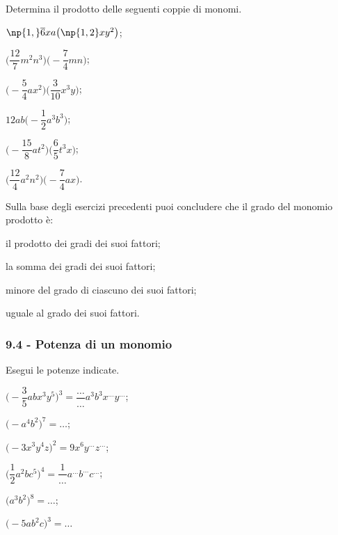 \begin{esercizio}
 \label{ese:9.15}
Determina il prodotto delle seguenti coppie di monomi.
\begin{multicols}{3}
\begin{enumeratea}
 \item $\np{1,}\overline{{6}}xa\big(\np{1,2}xy^{2}\big)$;
 \item $\bigg(\dfrac{12}{7}m^{2}n^{3}\bigg)\bigg(-{\dfrac{7}{4}}mn\bigg)$;
 \item $\bigg(-{\dfrac{5}{4}}ax^{2}\bigg)\bigg(\dfrac{3}{10}x^{3}y\bigg)$;
 \item $12ab\bigg(-{\dfrac{1}{2}}a^{3}b^{3}\bigg)$;
 \item $\bigg(-{\dfrac{15}{8}}at^{2}\bigg)\bigg(\dfrac{6}{5}t^{3}x\bigg)$;
 \item $\bigg(\dfrac{12}{4}a^{2}n^{2}\bigg)\bigg(-{\dfrac{7}{4}}ax\bigg)$.
\end{enumeratea}
\end{multicols}
\end{esercizio}


\begin{esercizio}
 \label{ese:9.16}
Sulla base degli esercizi precedenti puoi concludere che il grado del monomio prodotto è:

\begin{enumeratea}
 \item il prodotto dei gradi dei suoi fattori;
 \item la somma dei gradi dei suoi fattori;
 \item minore del grado di ciascuno dei suoi fattori;
 \item uguale al grado dei suoi fattori.
\end{enumeratea}
\end{esercizio}

\subsubsection*{9.4 - Potenza di un monomio}
\begin{esercizio}
 \label{ese:9.17}
 Esegui le potenze indicate.
\begin{multicols}{2}
\begin{enumeratea}
\spazielenx
 \item $\bigg(-{\dfrac{3}{5}}abx^{3}y^{5}\bigg)^{3}=\dfrac{\ldots }{\ldots}a^{3}b^{3}x^{\ldots }y^{\ldots}$;
 \item $\big(-a^{4}b^{2}\big)^{7}=\ldots$;
 \item $\bigg(-3x^{3}y^{4}z\bigg)^{2}=9x^{6}y^{\ldots }z^{\ldots }$;
 \item $\bigg(\dfrac{1}{2}a^{2}bc^{5}\bigg)^{4}=\dfrac{1}{\ldots}a^{\ldots}b^{\ldots}c^{\ldots}$;
 \item $\big(a^{3}b^{2}\big)^{8}=\ldots$;
 \item $\big(-5ab^{2}c\big)^{3}=\ldots$
\end{enumeratea}
\end{multicols}
\end{esercizio}

